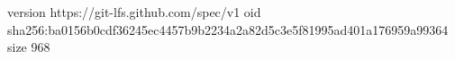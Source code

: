 version https://git-lfs.github.com/spec/v1
oid sha256:ba0156b0cdf36245ec4457b9b2234a2a82d5c3e5f81995ad401a176959a99364
size 968

